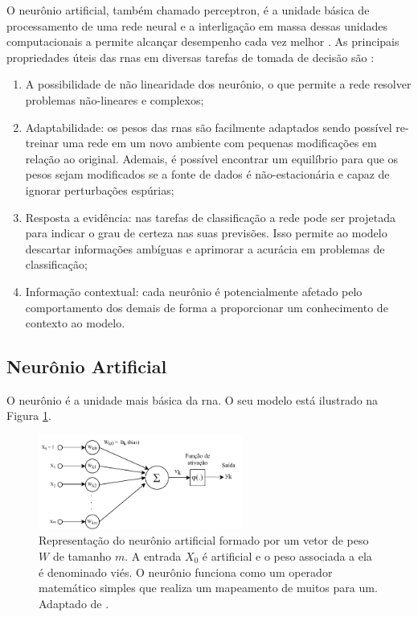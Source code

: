 O neurônio artificial, também chamado perceptron, é a unidade básica de processamento de uma rede neural e a interligação em massa dessas unidades computacionais a permite alcançar desempenho cada vez melhor \cite{Haykin}.  As principais propriedades úteis das \acrshort{rna}s em diversas tarefas de tomada de decisão são \cite{Haykin}:
\begin{enumerate}
	\item A possibilidade de não linearidade dos neurônio, o que permite a rede resolver problemas não-lineares e complexos;
	\item  Adaptabilidade: os pesos das \acrshort{rna}s são facilmente adaptados sendo possível re-treinar uma rede em um novo ambiente com pequenas modificações em relação ao original. Ademais, é possível encontrar um equilíbrio para que os pesos sejam modificados se a fonte de dados é não-estacionária e capaz de ignorar perturbações espúrias;
	\item Resposta a evidência: nas tarefas de classificação a rede pode ser projetada para indicar o grau de certeza nas suas previsões. Isso permite ao modelo descartar informações ambíguas e aprimorar a acurácia em problemas de classificação;
	\item Informação contextual: cada neurônio é potencialmente afetado pelo comportamento dos demais de forma a proporcionar um conhecimento de contexto ao modelo.
\end{enumerate}



\subsection{Neurônio Artificial}
O neurônio é a unidade mais básica da \acrshort{rna}. O seu modelo está ilustrado na Figura \ref{fig:neuronio}.

\begin{figure}[h]
	\centering
	\includegraphics[width=0.6\textwidth]{figuras/neuronio.pdf}
	\caption[Modelo do neurônio matemático.]{Representação do neurônio artificial formado por um vetor de peso $W$ de tamanho $m$. A entrada $X_0$ é artificial e o peso associada a ela é denominado viés. O neurônio funciona como um operador matemático simples que realiza um mapeamento de muitos para um. Adaptado de \cite{Haykin}.}
	\label{fig:neuronio}
\end{figure}

